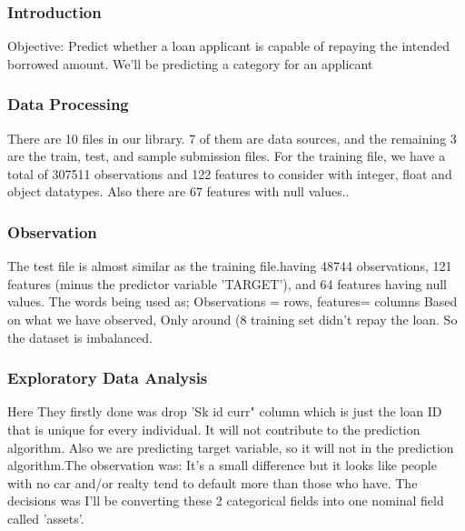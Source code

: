 \documentclass[twoside,a4paper]{article}
\begin{document}
\subsubsection{Introduction}
Objective: Predict whether  a loan applicant is capable of repaying the intended borrowed amount.
We'll be predicting a category for an applicant
\subsubsection{Data Processing}
There are 10 files in our library. 7 of them are data sources, and the remaining 3 are the train, test, and sample submission files.
For the training file, we have a total of 307511 observations and 122 features to consider with integer, float and object datatypes. Also there are 67 features with null values..
\subsubsection{Observation}
The test file is almost similar as the training file.having 48744 observations, 121 features (minus the predictor variable 'TARGET'), and 64 features having null values.
The words being used as; Observations = rows, features= columns
Based on what we have observed, Only around (8%
training set didn't repay the loan. So the dataset is imbalanced. 
\subsubsection{Exploratory Data Analysis}
Here They firstly done was drop 'Sk id curr" column which is just the loan ID that is unique for every individual. It will not contribute to the prediction algorithm.
Also we are predicting target variable, so it will not in the prediction algorithm.The observation was:
It's a small difference but it looks like people with no car and/or realty tend to default more than those who have. The decisions was I'll be converting these 2 categorical fields into one nominal field called 'assets'.
\end{document}
